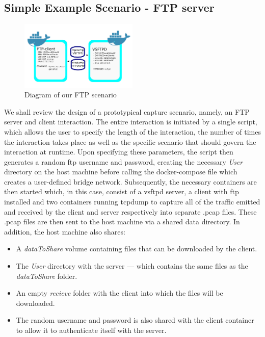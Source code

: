 \documentclass[msc,deptreport, cs]{infthesis} %
\begin{document}
    \subsection{Simple Example Scenario - FTP server}
              \begin{figure}[h!]
\centering
\includegraphics[width=0.50\textwidth]{ftp_example.png}
\caption{Diagram of our FTP scenario}
\end{figure}
    We shall review the design of a prototypical capture scenario, namely, an FTP server and client interaction. The entire interaction is initiated by a single script, which allows the user to specify the length of the interaction, the number of times the interaction takes place as well as the specific scenario that should govern the interaction at runtime. Upon specifying these parameters, the script then generates a random ftp username and password, creating the necessary \textit{User} directory on the host machine before calling the docker-compose file which creates a user-defined bridge network. Subsequently, the necessary containers are then started which, in this case, consist of a vsftpd server, a client with ftp installed and two containers running tcpdump to capture all of the traffic emitted and received by the client and server respectively into separate .pcap files. These .pcap files are then sent to the host machine via a shared data directory. In addition, the host machine also shares:
    
    \begin{itemize}
        \item A \textit{dataToShare} volume containing files that can be downloaded by the client.
        \item The \textit{User} directory with the server --- which contains the same files as the \textit{dataToShare} folder.
        \item An empty \textit{recieve} folder with the client into which the files will be downloaded.
        \item The random username and password is also shared with the client container to allow it to authenticate itself with the server.
    \end{itemize}
    
\end{document}
